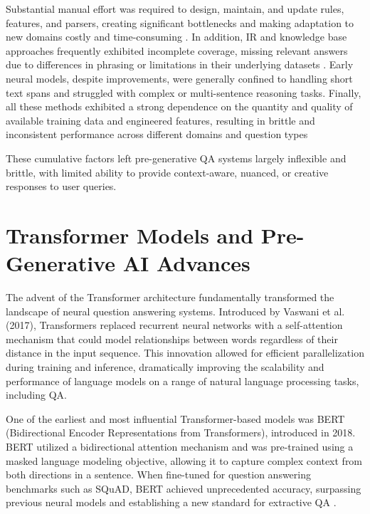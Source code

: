\begin{spacing}{1.5}
Substantial manual effort was required to design, maintain, and update rules, features, and parsers, creating significant bottlenecks and making adaptation to new domains costly and time-consuming \citep{alanazi_question_2021}. In addition, IR and knowledge base approaches frequently exhibited incomplete coverage, missing relevant answers due to differences in phrasing or limitations in their underlying datasets \citep{diefenbach_core_2018}. Early neural models, despite improvements, were generally confined to handling short text spans and struggled with complex or multi-sentence reasoning tasks. Finally, all these methods exhibited a strong dependence on the quantity and quality of available training data and engineered features, resulting in brittle and inconsistent performance across different domains and question types \citep{alanazi_question_2021, alqifari_question_2019, diefenbach_core_2018, hirschman_natural_2001}

These cumulative factors left pre-generative QA systems largely inflexible and brittle, with limited ability to provide context-aware, nuanced, or creative responses to user queries.

\section{Transformer Models and Pre-Generative AI Advances}
The advent of the Transformer architecture fundamentally transformed the landscape of neural question answering systems. Introduced by Vaswani et al. (2017), Transformers replaced recurrent neural networks with a self-attention mechanism that could model relationships between words regardless of their distance in the input sequence. This innovation allowed for efficient parallelization during training and inference, dramatically improving the scalability and performance of language models on a range of natural language processing tasks, including QA.

One of the earliest and most influential Transformer-based models was BERT (Bidirectional Encoder Representations from Transformers), introduced in 2018. BERT utilized a bidirectional attention mechanism and was pre-trained using a masked language modeling objective, allowing it to capture complex context from both directions in a sentence. When fine-tuned for question answering benchmarks such as SQuAD, BERT achieved unprecedented accuracy, surpassing previous neural models and establishing a new standard for extractive QA \citep{devlin_bert_2019}.


\end{spacing}
